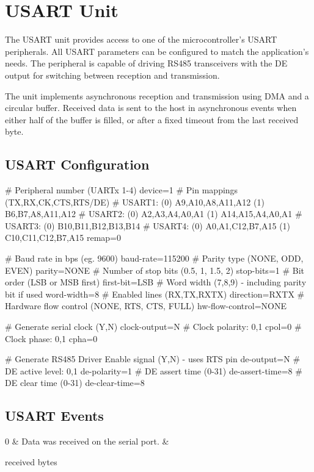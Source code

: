 \section{USART Unit}

The \gls{USART} unit provides access to one of the microcontroller's \gls{USART} peripherals. All \gls{USART} parameters can be configured to match the application's needs. The peripheral is capable of driving RS485 transceivers with the \gls{DE} output for switching between reception and transmission.

The unit implements asynchronous reception and transmission using DMA and a circular buffer. Received data is sent to the host in asynchronous events when either half of the buffer is filled, or after a fixed timeout from the last received byte.

\subsection{USART Configuration}

\begin{inicode}
# Peripheral number (UARTx 1-4)
device=1
# Pin mappings (TX,RX,CK,CTS,RTS/DE)
#  USART1: (0) A9,A10,A8,A11,A12   (1) B6,B7,A8,A11,A12
#  USART2: (0) A2,A3,A4,A0,A1      (1) A14,A15,A4,A0,A1
#  USART3: (0) B10,B11,B12,B13,B14
#  USART4: (0) A0,A1,C12,B7,A15    (1) C10,C11,C12,B7,A15
remap=0

# Baud rate in bps (eg. 9600)
baud-rate=115200
# Parity type (NONE, ODD, EVEN)
parity=NONE
# Number of stop bits (0.5, 1, 1.5, 2)
stop-bits=1
# Bit order (LSB or MSB first)
first-bit=LSB
# Word width (7,8,9) - including parity bit if used
word-width=8
# Enabled lines (RX,TX,RXTX)
direction=RXTX
# Hardware flow control (NONE, RTS, CTS, FULL)
hw-flow-control=NONE

# Generate serial clock (Y,N)
clock-output=N
# Clock polarity: 0,1
cpol=0
# Clock phase: 0,1
cpha=0

# Generate RS485 Driver Enable signal (Y,N) - uses RTS pin
de-output=N
# DE active level: 0,1
de-polarity=1
# DE assert time (0-31)
de-assert-time=8
# DE clear time (0-31)
de-clear-time=8
\end{inicode}


\subsection{USART Events}

\begin{cmdlist}

	0 & 
	Data was received on the serial port.
	&
    \begin{cmdpld}
		 received bytes
    \end{cmdpld} \\

\end{cmdlist}


